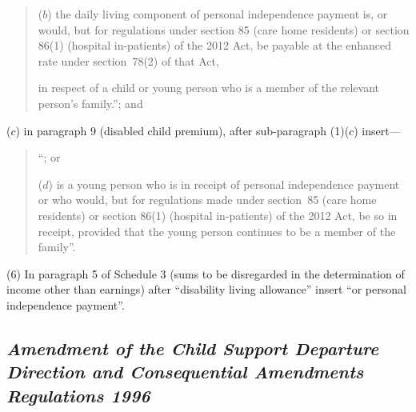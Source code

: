 \documentclass[12pt,a4paper]{article}
\begin{document}
\begin{enumerate}
\begin{quotation}
\begin{enumerate}
($b$) the daily living component of personal independence payment is, or would, but for regulations under section 85 (care home residents) or section 86(1) (hospital in-patients) of the 2012 Act, be payable at the enhanced rate under section~78(2) of that Act,
\end{enumerate}
in respect of a child or young person who is a member of the relevant person’s family.”; and
\end{quotation}

($c$) in paragraph 9 (disabled child premium), after sub-paragraph (1)($c$)  insert—
\begin{quotation}
“; or

($d$) is a young person who is in receipt of personal independence payment or who would, but for regulations made under section~85 (care home residents) or section 86(1) (hospital in-patients) of the 2012 Act, be so in receipt, provided that the young person continues to be a member of the family”.
\end{quotation}
\end{enumerate}

(6) In paragraph 5 of Schedule 3 (sums to be disregarded in the determination of income other than earnings) after “disability living allowance” insert “or personal independence payment”.

\subsection*{\itshape Amendment of the Child Support Departure Direction and Consequential Amendments Regulations 1996}
\end{document}
